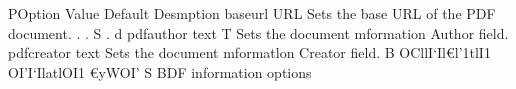 
POption Value Default Desmption 
baseurl URL Sets the base URL of the PDF document. 
. . S . d 
pdfauthor text T Sets the document mformation Author field. 
pdfcreator text Sets the document mformatlon Creator field. 
B OCllI‘Il€l'1tlI1 OI'I‘IlatlOI1 €yWOI' S BDF information options 
